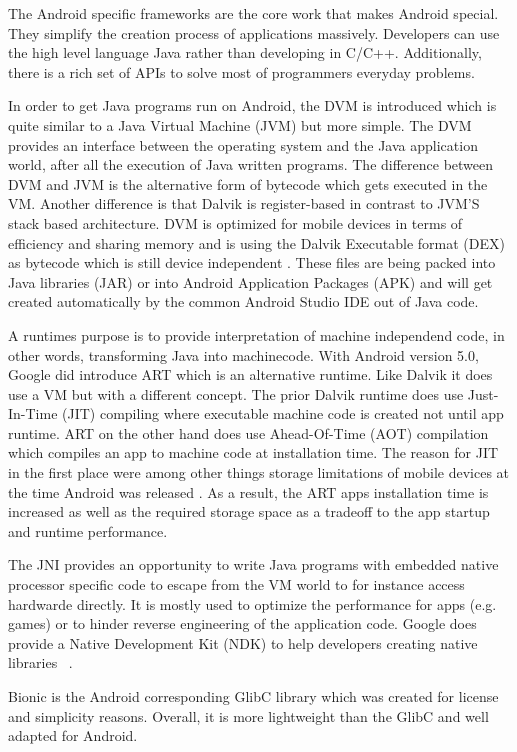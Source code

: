 The Android specific frameworks are the core work that makes Android
special. They simplify the creation process of applications massively.
Developers can use the high level language Java rather than developing
in C/C++. Additionally, there is a rich set of APIs to solve most of
programmers everyday problems.

In order to get Java programs run on Android, the DVM is introduced
which is quite similar to a Java Virtual Machine (JVM) but more simple.
The DVM provides an interface between the operating system and
the Java application world, after all the execution of Java written programs.
The difference between DVM and JVM is the alternative form of bytecode
which gets executed in the VM. Another difference is that Dalvik is
register-based in contrast to JVM'S stack based architecture.
DVM is optimized for mobile devices
in terms of efficiency and sharing memory and is using the
Dalvik Executable format (DEX) as bytecode which is still device
independent \parencite[p.11f]{levin}. These  files are being
packed into Java libraries (JAR) or into Android Application Packages (APK)
and will get created automatically by the common Android Studio IDE out
of Java code.

A runtimes purpose is to provide
interpretation of machine independend code, in other words,
transforming Java into machinecode.
With Android version 5.0, Google did introduce ART which is an
alternative runtime. Like Dalvik it does use a VM but with a
different concept.
The prior Dalvik runtime does use Just-In-Time (JIT) compiling
where executable machine code is created not until app runtime.
ART on the other hand does use Ahead-Of-Time (AOT) compilation
which compiles an app to machine code at installation time.
The reason for JIT in the first place were among other things
storage limitations of mobile devices at the time Android was released
\parencite[p.11f]{levin}. As a result, the ART apps installation time
is increased as well as the required storage space as a tradeoff
to the app startup and runtime performance.

The JNI provides an opportunity to write Java programs with embedded
native processor specific code to escape from the VM world to for
instance access hardwarde directly.
It is mostly used to optimize the performance for apps (e.g. games)
or to hinder reverse engineering of the application code.
Google does provide a Native Development Kit (NDK) to help
developers creating native libraries ~\parencite{ndk}.

Bionic is the Android corresponding GlibC library which was created
for license and simplicity reasons. Overall, it is more lightweight
than the GlibC and well adapted for Android.

